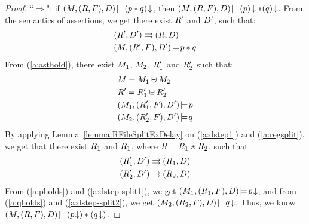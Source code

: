 {\color{blue}
\begin{proof}
	``$\Rightarrow$": 
	if ${(M, (R, F), D)}\!\models\!{{(p*q)}\!\downarrow}$, then 
	${(M, (R, F), D)}\!\models\!{{(p)}\!\downarrow*{(q)}\!\downarrow}$. 
	From the semantics of assertions, 
	we get there exist $R'$ and $D'$, such that:
	\begin{align}
		& {(R', D')}\rightrightarrows{(R, D)} \label{a:dstep1} \\
		& {(M, (R', F), D')}\!\models\!{p*q} \label{a:asthold}
	\end{align}
	From (\ref{a:asthold}), there exist 
	$M_1$, $M_2$, $R_1'$ and $R_2'$ such that:
	\begin{align}
		& M = M_1\uplus M_2 
		\label{a:memsplit} \\
		& R' = R_1'\uplus R_2'
		\label{a:regsplit} \\
		& {(M_1, (R_1', F), D')}\!\models\!{p} 
		\label{a:pholds} \\
		& {(M_2, (R_2', F), D')}\!\models\!{q}
		\label{a:qholds} 
	\end{align}
	By applying Lemma~\ref{lemma:RFileSplitExDelay}
	on (\ref{a:dstep1}) and (\ref{a:regsplit}), we get 
	that there exist $R_1$ and $R_1$, 
	where $R = R_1\uplus R_2$, such that
	\begin{align}
		& {(R_1', D')}\rightrightarrows{(R_1, D)}
		\label{a:dstep-split1} \\
		& {(R_2', D')}\rightrightarrows{(R_2, D)}
		\label{a:dstep-split2}
	\end{align}
	From (\ref{a:pholds}) and (\ref{a:dstep-split1}), 
	we get ${(M_1, (R_1, F), D)}\!\models\!{{p}\!\downarrow}$; 
	and from (\ref{a:qholds}) and (\ref{a:dstep-split2}), 
	we get ${(M_2, (R_2, F), D)}\!\models\!{{q}\!\downarrow}$.
	Thus, we know
	${(M, (R, F), D)}\!\models\!{({p}\!\downarrow)*({q}\!\downarrow)}$.


\end{proof}}
